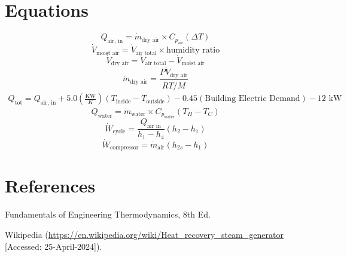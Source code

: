 \documentclass{article}
\begin{document}
\section*{Equations}
\begin{equation}
Q_{\text{air, in}} = \dot{m}_{\text{dry air}} \times C_{p_{\text{air}}} (\Delta T)
\end{equation}
\begin{equation}
\dot{V}_{\text{moist air}} = \dot{V}_{\text{air total}} \times \text{humidity ratio}
\end{equation}
\begin{equation}
\dot{V}_{\text{dry air}} = \dot{V}_{\text{air total}} - \dot{V}_{\text{moist air}}
\end{equation}
\begin{equation}
\dot{m}_{\text{dry air}} = \frac{P\dot{V}_{\text{dry air}}}{\bar{R}T/M}
\end{equation}
\begin{multline}
Q_{\text{tot}} = Q_{\text{air, in}} + 5.0 \left(\frac{\text{KW}}{K}\right)(T_{\text{inside}} - T_{\text{outside}}) - 0.45(\text{Building Electric Demand}) - 12 \text{ kW}
\end{multline}
\begin{equation}
Q_{\text{water}} = \dot{m}_{\text{water}} \times C_{p_{\text{water}}} (T_H - T_C)
\end{equation}
\begin{equation}
\dot{W}_{\text{cycle}} = \frac{Q_{\text{air in}}}{h_1 - h_4} (h_2 - h_1)
\end{equation}
\begin{equation}
\dot{W}_{\text{compressor}} = \dot{m}_{\text{air}} (h_{2s} - h_1)
\end{equation}

\section*{References}
Fundamentals of Engineering Thermodynamics, 8th Ed.

Wikipedia (\url{https://en.wikipedia.org/wiki/Heat_recovery_steam_generator} [Accessed: 25-April-2024]).
\end{document}
